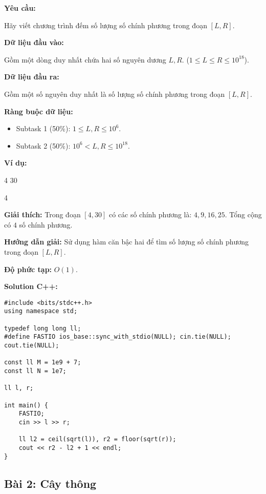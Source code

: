 \documentclass[12pt]{scrartcl}  %
\begin{document}
\textbf{Yêu cầu:}

Hãy viết chương trình đếm số lượng số chính phương trong đoạn $[L, R]$.

\textbf{Dữ liệu đầu vào:}

Gồm một dòng duy nhất chứa hai số nguyên dương $L, R$. ($1 \leq L \leq R \leq 10^{18}$).

\textbf{Dữ liệu đầu ra:}

Gồm một số nguyên duy nhất là số lượng số chính phương trong đoạn $[L, R]$.

\textbf{Ràng buộc dữ liệu:}

\begin{itemize}
    \item Subtask 1 (50\%): $1 \leq L, R \leq 10^6$.
    \item Subtask 2 (50\%): $10^6 < L, R \leq 10^{18}$.
\end{itemize}

\textbf{Ví dụ:}
\begin{tcolorbox}[colback=gray!5!white, colframe=blue!50!black, title=Input]
4 30
\end{tcolorbox}
\begin{tcolorbox}[colback=gray!5!white, colframe=green!50!black, title=Output]
4
\end{tcolorbox}

\textbf{Giải thích:}
Trong đoạn $[4, 30]$ có các số chính phương là: $4, 9, 16, 25$. Tổng cộng có $4$ số chính phương.

\textbf{Hướng dẫn giải:}
Sử dụng hàm căn bậc hai để tìm số lượng số chính phương trong đoạn $[L, R]$.

\textbf{Độ phức tạp:} $O(1)$.

\textbf{Solution C++:}
\begin{lstlisting}
#include <bits/stdc++.h>
using namespace std;

typedef long long ll;
#define FASTIO ios_base::sync_with_stdio(NULL); cin.tie(NULL); cout.tie(NULL);

const ll M = 1e9 + 7;
const ll N = 1e7;

ll l, r;

int main() {
    FASTIO;
    cin >> l >> r;

    ll l2 = ceil(sqrt(l)), r2 = floor(sqrt(r));
    cout << r2 - l2 + 1 << endl;
}

\end{lstlisting}

\subsection{Bài 2: Cây thông}
\end{document}
